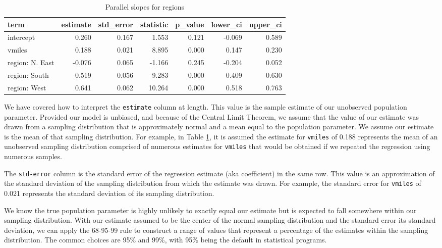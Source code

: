 \documentclass[
]{book}
\begin{document}
\begin{table}

\caption{\label{tab:extable}Parallel slopes for regions}
\centering
\begin{tabular}[t]{l|r|r|r|r|r|r}
\hline
term & estimate & std\_error & statistic & p\_value & lower\_ci & upper\_ci\\
\hline
intercept & 0.260 & 0.167 & 1.553 & 0.121 & -0.069 & 0.589\\
\hline
vmiles & 0.188 & 0.021 & 8.895 & 0.000 & 0.147 & 0.230\\
\hline
region: N. East & -0.076 & 0.065 & -1.166 & 0.245 & -0.204 & 0.052\\
\hline
region: South & 0.519 & 0.056 & 9.283 & 0.000 & 0.409 & 0.630\\
\hline
region: West & 0.641 & 0.062 & 10.264 & 0.000 & 0.518 & 0.763\\
\hline
\end{tabular}
\end{table}

We have covered how to interpret the \texttt{estimate} column at length. This value is the sample estimate of our unobserved population parameter. Provided our model is unbiased, and because of the Central Limit Theorem, we assume that the value of our estimate was drawn from a sampling distribution that is approximately normal and a mean equal to the population parameter. We assume our estimate is the mean of that sampling distribution. For example, in Table \ref{tab:extable}, it is assumed the estimate for \texttt{vmiles} of 0.188 represents the mean of an unobserved sampling distribution comprised of numerous estimates for \texttt{vmiles} that would be obtained if we repeated the regression using numerous samples.

The \texttt{std-error} column is the standard error of the regression estimate (aka coefficient) in the same row. This value is an approximation of the standard deviation of the sampling distribution from which the estimate was drawn. For example, the standard error for \texttt{vmiles} of 0.021 represents the standard deviation of its sampling distribution.

We know the true population parameter is highly unlikely to exactly equal our estimate but is expected to fall somewhere within our sampling distribution. With our estimate assumed to be the center of the normal sampling distribution and the standard error its standard deviation, we can apply the 68-95-99 rule to construct a range of values that represent a percentage of the estimates within the sampling distribution. The common choices are 95\% and 99\%, with 95\% being the default in statistical programs.
\end{document}
